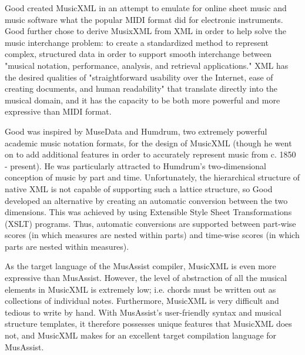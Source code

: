 \documentclass{report}
\begin{document}
Good created MusicXML in an attempt to emulate for online sheet music and music software what the popular MIDI format did for electronic instruments. Good further chose to derive MusixXML from XML in order to help solve the music interchange problem: to create a standardized method to represent complex, structured data in order to support smooth interchange between "musical notation, performance, analysis, and retrieval applications." XML has the desired qualities of "straightforward usability over the Internet, ease of creating documents, and human readability" that translate directly into the musical domain, and it has the capacity to be both more powerful and more expressive than MIDI format. \cite{good_2001}

Good was inspired by MuseData and Humdrum, two extremely powerful academic music notation formats, for the design of MusicXML (though he went on to add additional features in order to accurately represent music from c. 1850 - present). He was particularly attracted to Humdrum's two-dimensional conception of music by part and time. Unfortunately, the hierarchical structure of native XML is not capable of supporting such a lattice structure, so Good developed an alternative by creating an automatic conversion between the two dimensions. This was achieved by using Extensible Style Sheet Transformations (XSLT) programs. Thus, automatic conversions are supported between part-wise scores (in which measures are nested within parts) and time-wise scores (in which parts are nested within measures). \cite{good_2013}

As the target language of the MusAssist compiler, MusicXML is even more expressive than MusAssist. However, the level of abstraction of all the musical elements in MusicXML is extremely low;  i.e. chords must be written out as collections of individual notes. Furthermore, MusicXML is very difficult and tedious to write by hand. With MusAssist's user-friendly syntax and musical structure templates, it therefore possesses unique features that MusicXML does not, and MusicXML makes for an excellent target compilation language for MusAssist. 
\end{document}
